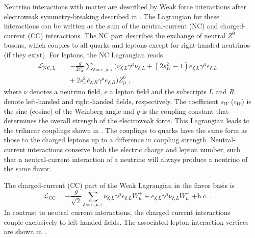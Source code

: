 Neutrino interactions with matter are described by Weak force interactions after electroweak symmetry-breaking described in .
The Lagrangian for these interactions can be written as the sum of the neutral-current (NC) and charged-current (CC) interactions.
The NC part describes the exchange of neutral $Z^0$ bosons, which couples to all quarks and leptons except for right-handed neutrinos (if they exist).
For leptons, the NC Lagrangian reads
\begin{align}
    \mathcal{L}_\mathrm{NC,L} &= -\frac{g}{2 c_W^2} \sum_{\mathcal{l}=e,\mu,\tau} (\bar{\nu}_{\mathcal{l}, L} \gamma^\mu \nu_{\mathcal{l}, L} + (2 s_W^2 - 1) \bar{e}_{\mathcal{l}, L} \gamma^\mu e_{\mathcal{l}, L} \nonumber \\
    &\quad + 2s_w^2 \bar{e}_{\mathcal{l}, R} \gamma^\mu e_{\mathcal{l}, R}) Z^0_\mu\;, \label{eq:ew-nc-lagrangian}
\end{align}
where $\nu$ denotes a neutrino field, $e$ a lepton field and the subscripts $L$ and $R$ denote left-handed and right-handed fields, respectively.
The coefficient $s_W$ ($c_W$) is the sine (cosine) of the Weinberg angle and $g$ is the coupling constant that determines the overall strength of the electroweak force.
This Lagrangian leads to the trilinear couplings shown in .
The couplings to quarks have the same form as those to the charged leptons up to a difference in coupling strength.
Neutral-current interactions conserve both the electric charge and lepton number, such that a neutral-current interaction of a neutrino will always produce a neutrino of the same flavor.

The charged-current (CC) part of the Weak Lagrangian in the flavor basis is
\begin{equation}
    \mathcal{L}_\mathrm{CC} = -\frac{g}{\sqrt{2}} \sum_{\mathcal{l}=e,\mu,\tau} \bar{\nu}_{\mathcal{l},L} \gamma^\mu e_{\mathcal{l},L} W^+_\mu + \bar{e}_{\mathcal{l},L} \gamma^\mu \nu_{\mathcal{l},L} W^-_\mu\;\mathrm{+h.c.}\;.\label{eq:ew-cc-lagrangian}
\end{equation}
In contrast to neutral current interactions, the charged current interactions couple exclusively to left-handed fields.
The associated lepton interaction vertices are shown in .

